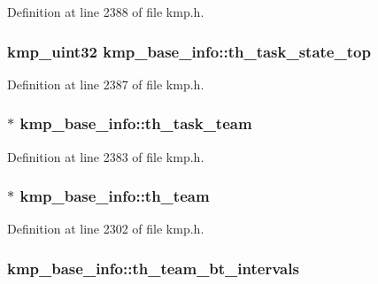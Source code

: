 Definition at line 2388 of file kmp.\-h.

\hypertarget{structkmp__base__info_a48b13afdce18fdf958925f449b734c34}{
\subsubsection[{th\-\_\-task\-\_\-state\-\_\-top}]{\setlength{\rightskip}{0pt plus 5cm}kmp\-\_\-uint32 kmp\-\_\-base\-\_\-info\-::th\-\_\-task\-\_\-state\-\_\-top}}\label{structkmp__base__info_a48b13afdce18fdf958925f449b734c34}


Definition at line 2387 of file kmp.\-h.

\hypertarget{structkmp__base__info_a282edcc15b1d3fa565c3c2faee030138}{
\subsubsection[{th\-\_\-task\-\_\-team}]{$\ast$ kmp\-\_\-base\-\_\-info\-::th\-\_\-task\-\_\-team}}\label{structkmp__base__info_a282edcc15b1d3fa565c3c2faee030138}


Definition at line 2383 of file kmp.\-h.

\hypertarget{structkmp__base__info_a96385010dd060b2daec2310a7ddbe03e}{
\subsubsection[{th\-\_\-team}]{$\ast$ kmp\-\_\-base\-\_\-info\-::th\-\_\-team}}\label{structkmp__base__info_a96385010dd060b2daec2310a7ddbe03e}


Definition at line 2302 of file kmp.\-h.

\hypertarget{structkmp__base__info_a8b53d9a59e974d814d0d222ea6e3feb9}{
\subsubsection[{th\-\_\-team\-\_\-bt\-\_\-intervals}]{ kmp\-\_\-base\-\_\-info\-::th\-\_\-team\-\_\-bt\-\_\-intervals}}\label{structkmp__base__info_a8b53d9a59e974d814d0d222ea6e3feb9}


